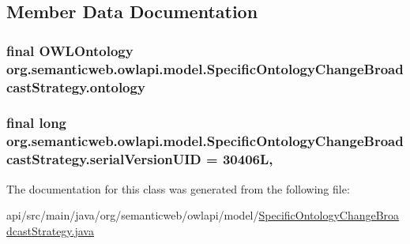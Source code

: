 \subsection{Member Data Documentation}
\hypertarget{classorg_1_1semanticweb_1_1owlapi_1_1model_1_1_specific_ontology_change_broadcast_strategy_af4b0b8748c0a20d8b82094032336d6d4}{
\subsubsection[{ontology}]{\setlength{\rightskip}{0pt plus 5cm}final {\bf O\-W\-L\-Ontology} org.\-semanticweb.\-owlapi.\-model.\-Specific\-Ontology\-Change\-Broadcast\-Strategy.\-ontology\hspace{0.3cm}{\ttfamily [private]}}}\label{classorg_1_1semanticweb_1_1owlapi_1_1model_1_1_specific_ontology_change_broadcast_strategy_af4b0b8748c0a20d8b82094032336d6d4}
\hypertarget{classorg_1_1semanticweb_1_1owlapi_1_1model_1_1_specific_ontology_change_broadcast_strategy_a4f70d4145b1ea20855f1ba0eb9a5a7e7}{
\subsubsection[{serial\-Version\-U\-I\-D}]{\setlength{\rightskip}{0pt plus 5cm}final long org.\-semanticweb.\-owlapi.\-model.\-Specific\-Ontology\-Change\-Broadcast\-Strategy.\-serial\-Version\-U\-I\-D = 30406\-L\hspace{0.3cm}{\ttfamily [static]}, {\ttfamily [private]}}}\label{classorg_1_1semanticweb_1_1owlapi_1_1model_1_1_specific_ontology_change_broadcast_strategy_a4f70d4145b1ea20855f1ba0eb9a5a7e7}


The documentation for this class was generated from the following file\-:\begin{DoxyCompactItemize}
\item 
api/src/main/java/org/semanticweb/owlapi/model/\hyperlink{_specific_ontology_change_broadcast_strategy_8java}{Specific\-Ontology\-Change\-Broadcast\-Strategy.\-java}\end{DoxyCompactItemize}
